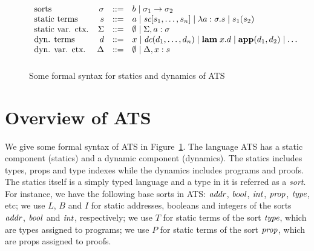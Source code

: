 \documentclass{llncs}
\begin{document}
\def\pADD{{\bf ADD}}

\begin{figure}
\[\begin{array}{lrcl}
\mbox{sorts} & \sigma & ::= & b \mid\sigma_1\rightarrow\sigma_2 \\
\mbox{static terms} & s & ::= & a \mid \mbox{\it sc}[s_1,\ldots,s_n] \mid \lambda a:\sigma.s \mid s_1(s_2) \\
\mbox{static var. ctx.} & \Sigma & ::= & \emptyset \mid \Sigma, a:\sigma \\
\mbox{dyn. terms} & d & ::= & x \mid \mbox{\it dc}(d_1,\ldots,d_n) \mid \mbox{\bf lam}\;x.d \mid {\bf app}(d_1,d_2) \mid \ldots \\
\mbox{dyn. var. ctx.} & \Delta & ::= & \emptyset \mid \Delta, x:s \\[6pt]
\end{array}\]
\caption{Some formal syntax for statics and dynamics of ATS}
\label{figure:ATSsyntax}
\end{figure}
\section{Overview of ATS}\label{section:ATSoverview}
We give some formal syntax of ATS in Figure~\ref{figure:ATSsyntax}.  The
language ATS has a static component (statics) and a dynamic component
(dynamics). The statics includes types, props and type indexes while the
dynamics includes programs and proofs. The statics itself is a simply typed
language and a type in it is referred as a {\em sort}. For instance, we
have the following base sorts in ATS: $\it addr$, $\it bool$, $\it int$,
$\it prop$, $\it type$, etc; we use $L$, $B$ and $I$ for static addresses,
booleans and integers of the sorts $\it addr$, $\it bool$ and $\it int$,
respectively; we use $T$ for static terms of the sort $\it type$, which are
types assigned to programs; we use $P$ for static terms of the sort
$\it prop$, which are props assigned to proofs.
\end{document}
